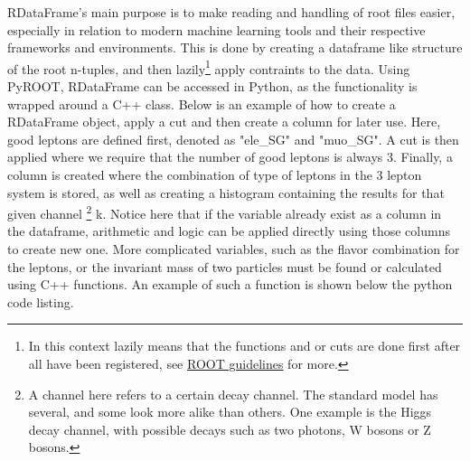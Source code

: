 RDataFrame's main purpose is to make reading and handling of root files easier, especially in relation to modern machine learning tools and their respective frameworks and environments. 
This is done by creating a dataframe like structure of the root n-tuples, and then lazily\footnote{In this context lazily means that the functions and or cuts are done first after all have been registered, see \href{https://root.cern/doc/master/classROOT_1_1RDataFrame.html}{ROOT guidelines} for more.} 
apply contraints to the data. Using PyROOT, RDataFrame can be accessed in Python, as the functionality is wrapped around a C++ class. Below is an example of how
to create a RDataFrame object, apply a cut and then create a column for later use. Here, good leptons are defined first, denoted as "ele\_SG" and "muo\_SG". 
A cut is then applied where we require that the number of good leptons is always 3. Finally, a column is created where the combination of type of leptons in the 3 lepton system 
is stored, as well as creating a histogram containing the results for that given channel \footnote{A channel here refers to a certain decay channel. The standard model has several, and some look more alike than others. One example is the Higgs decay channel, with possible decays such as two photons, W bosons or Z bosons. } k. 
Notice here that if the variable already exist as a column in the dataframe, arithmetic and logic can be 
applied directly using those columns to create new one. More complicated variables, such as the flavor combination for the leptons, or the invariant mass of two particles must be 
found or calculated using C++ functions. An example of such a function is shown below the python code listing. 


